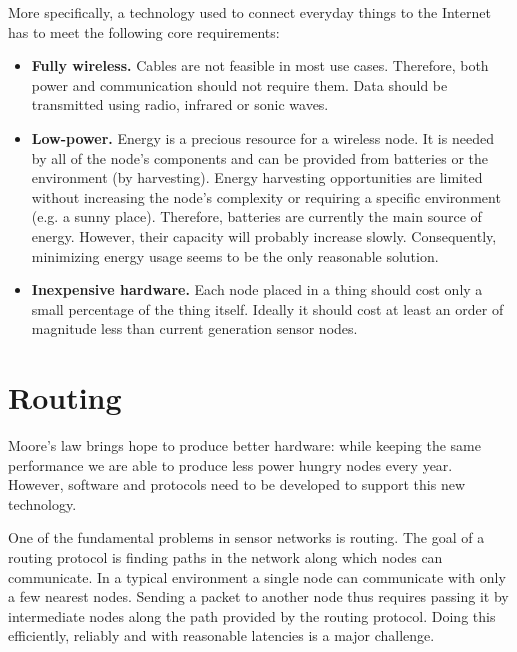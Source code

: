 More specifically, a technology used to connect everyday things to the Internet has to meet the following core requirements:
\begin{itemize}
  \item \textbf{Fully wireless.} Cables are not feasible in most use cases. Therefore, both power and communication should not require them.
Data should be transmitted using radio, infrared or sonic waves.
  \item \textbf{Low-power.} Energy is a precious resource for a wireless node.
It is needed by all of the node's components and can be provided from batteries or the environment (by harvesting).
Energy harvesting opportunities are limited without increasing the node's complexity or requiring a specific environment (e.g. a sunny place).
Therefore, batteries are currently the main source of energy.
However, their capacity will probably increase slowly.
Consequently, minimizing energy usage seems to be the only reasonable solution.
  \item \textbf{Inexpensive hardware.} Each node placed in a thing should cost only a small percentage of the thing itself.
Ideally it should cost at least an order of magnitude less than current generation sensor nodes.
\end{itemize}

\section{Routing}
Moore's law brings hope to produce better hardware: while keeping the same performance we are able to produce less power hungry nodes every year.
However, software and protocols need to be developed to support this new technology.

One of the fundamental problems in sensor networks is routing.
The goal of a routing protocol is finding paths in the network along which nodes can communicate.
In a typical environment a single node can communicate with only a few nearest nodes.
Sending a packet to another node thus requires passing it by intermediate nodes along the path provided by the routing protocol.
Doing this efficiently, reliably and with reasonable latencies is a major challenge.

